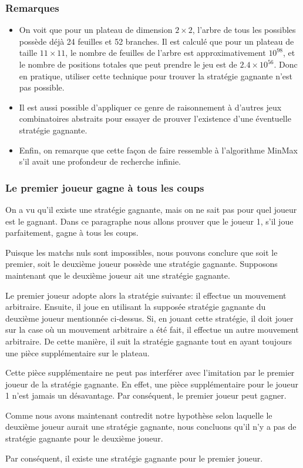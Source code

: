 \subsubsection{Remarques}
\begin{itemize}
    \item On voit que pour un plateau de dimension $2\times2$, l'arbre de tous les possibles possède déjà 24 feuilles et 52 branches.
    Il est calculé que pour un plateau de taille $11\times11$, le nombre de feuilles de l'arbre est
    approximativement $10^{98}$, et le nombre de positions totales que peut prendre le jeu est de $2.4\times10^{56}$.
    Donc en pratique, utiliser cette technique pour trouver la stratégie gagnante n'est pas possible.
    \item Il est aussi possible d'appliquer ce genre de raisonnement à d'autres jeux combinatoires abstraits pour essayer de
    prouver l'existence d'une éventuelle stratégie gagnante.
    \item Enfin, on remarque que cette façon de faire ressemble à l'algorithme MinMax s'il avait une profondeur de recherche
    infinie.
\end{itemize}

\subsubsection{Le premier joueur gagne à tous les coups}
On a vu qu'il existe une stratégie gagnante, mais on ne sait pas pour quel joueur est le gagnant. Dans ce paragraphe nous allons
prouver que le joueur 1, s'il joue parfaitement, gagne à tous les coups.

Puisque les matchs nuls sont impossibles, nous pouvons conclure que soit le premier, soit le deuxième joueur possède une stratégie
gagnante. Supposons maintenant que le deuxième joueur ait une stratégie gagnante.

Le premier joueur adopte alors la stratégie suivante: il effectue un mouvement arbitraire. Ensuite, 
il joue en utilisant la supposée stratégie gagnante du deuxième joueur mentionnée ci-dessus. Si,
en jouant cette stratégie, il doit jouer sur la case où un mouvement arbitraire a été fait, il effectue
un autre mouvement arbitraire. De cette manière, il suit la stratégie gagnante tout en ayant toujours une pièce
supplémentaire sur le plateau.

Cette pièce supplémentaire ne peut pas interférer avec l'imitation par le premier joueur de la stratégie gagnante.
En effet, une pièce supplémentaire pour le joueur 1 n'est jamais un désavantage. Par conséquent, le premier joueur peut
gagner.

Comme nous avons maintenant contredit notre hypothèse selon laquelle le deuxième joueur aurait une stratégie gagnante,
nous concluons qu'il n'y a pas de stratégie gagnante pour le deuxième joueur.

Par conséquent, il existe une stratégie gagnante pour le premier joueur.